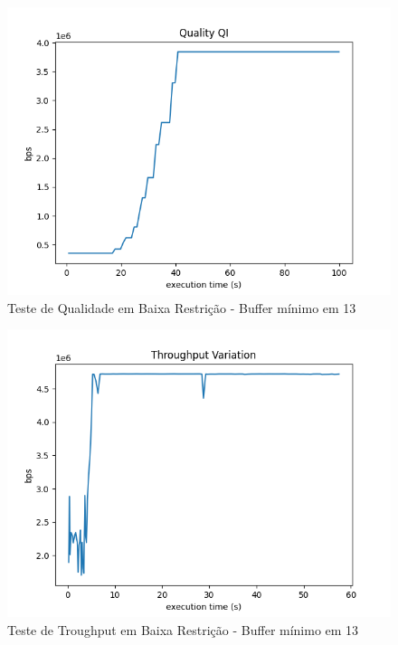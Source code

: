 \documentclass[10pt,twocolumn,letterpaper]{article}
\begin{document}
	\begin{figure}
		\centering
		\includegraphics[width=\linewidth]{playback_quality_qi.png}
		\caption{Teste de Qualidade em Baixa Restrição - Buffer mínimo em 13}
		\label{fig:7}
	\end{figure}
	\begin{figure}
		\centering
		\includegraphics[width=\linewidth]{throughput.png}
		\caption{Teste de Troughput em Baixa Restrição - Buffer mínimo em 13}
		\label{fig:8}
	\end{figure}
\end{document}
